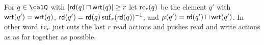 \begin{definition}
	For $q\in\Qx$ with $|\mathsf{rd}(q) \sqcap \mathsf{wrt}(q)| \geq r$ let $\operatorname{rc}_r(q)$ be the element $q'$  with $\mathsf{wrt}(q') = \mathsf{wrt}(q)$, $\mathsf{rd}(q')=\mathsf{rd}(q)\operatorname{suf}_{r}({\mathsf{rd}(q)})^{-1}$, and $\mu({q'}) = \mathsf{rd}(q') \sqcap \mathsf{wrt}(q')$.
	In other word $\operatorname{rc}_r$ just cuts the last $r$ read actions and pushes read and write actions as as far together as possible. 
\end{definition}


